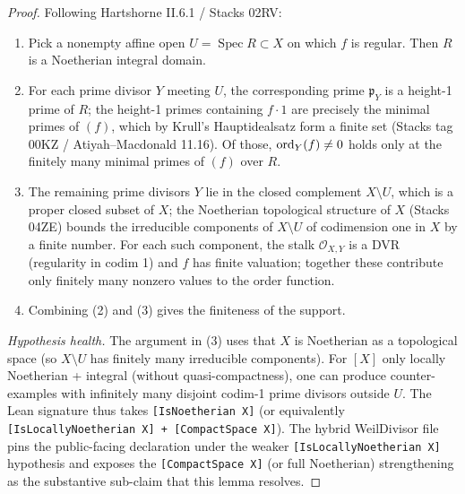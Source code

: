\begin{proof}
  Following Hartshorne II.6.1 / Stacks 02RV:
  \begin{enumerate}
  \item Pick a nonempty affine open \(U = \operatorname{Spec} R \subset X\) on
    which \(f\) is regular. Then \(R\) is a Noetherian integral domain.
  \item For each prime divisor \(Y\) meeting \(U\), the corresponding
    prime \(\mathfrak p_Y\) is a height-1 prime of \(R\); the height-1 primes
    containing \(f \cdot 1\) are precisely the minimal primes of
    \((f)\), which by Krull's Hauptidealsatz form a finite set (Stacks tag
    00KZ / Atiyah--Macdonald 11.16). Of those, \(\operatorname{ord}_Y(f) \ne 0\) holds
    only at the finitely many minimal primes of \((f)\) over \(R\).
  \item The remaining prime divisors \(Y\) lie in the closed complement
    \(X \setminus U\), which is a proper closed subset of \(X\); the
    Noetherian topological structure of \(X\) (Stacks 04ZE) bounds the
    irreducible components of \(X \setminus U\) of codimension one in
    \(X\) by a finite number. For each such component, the stalk
    \(\mathcal O_{X, Y}\) is a DVR (regularity in codim 1) and \(f\) has
    finite valuation; together these contribute only finitely many
    nonzero values to the order function.
  \item Combining (2) and (3) gives the finiteness of the support.
  \end{enumerate}
  \emph{Hypothesis health.} The argument in (3) uses that \(X\) is
  Noetherian as a topological space (so \(X \setminus U\) has finitely
  many irreducible components). For \([X]\) only locally Noetherian +
  integral (without quasi-compactness), one can produce
  counter-examples with infinitely many disjoint codim-1 prime
  divisors outside \(U\). The Lean signature thus takes
  \texttt{[IsNoetherian X]} (or equivalently
  \texttt{[IsLocallyNoetherian X] + [CompactSpace X]}). The hybrid
  WeilDivisor file pins the public-facing declaration under the
  weaker \texttt{[IsLocallyNoetherian X]} hypothesis and exposes the
  \texttt{[CompactSpace X]} (or full Noetherian) strengthening
  as the substantive sub-claim that this lemma resolves.
\end{proof}

